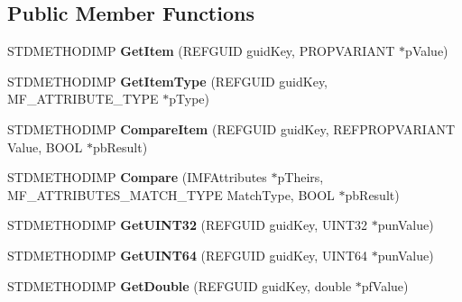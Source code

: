 \subsection*{Public Member Functions}
\begin{DoxyCompactItemize}
\item 
\mbox{\label{class_c_base_attributes_ade07ff0dab41dffe0e0ccc7b4f951cd3}} 
S\+T\+D\+M\+E\+T\+H\+O\+D\+I\+MP {\bfseries Get\+Item} (R\+E\+F\+G\+U\+ID guid\+Key, P\+R\+O\+P\+V\+A\+R\+I\+A\+NT $\ast$p\+Value)
\item 
\mbox{\label{class_c_base_attributes_aab0612685ed338a3b5761e9277651e1b}} 
S\+T\+D\+M\+E\+T\+H\+O\+D\+I\+MP {\bfseries Get\+Item\+Type} (R\+E\+F\+G\+U\+ID guid\+Key, M\+F\+\_\+\+A\+T\+T\+R\+I\+B\+U\+T\+E\+\_\+\+T\+Y\+PE $\ast$p\+Type)
\item 
\mbox{\label{class_c_base_attributes_ae48948090a3b75cc627a6dbda9ec4590}} 
S\+T\+D\+M\+E\+T\+H\+O\+D\+I\+MP {\bfseries Compare\+Item} (R\+E\+F\+G\+U\+ID guid\+Key, R\+E\+F\+P\+R\+O\+P\+V\+A\+R\+I\+A\+NT Value, B\+O\+OL $\ast$pb\+Result)
\item 
\mbox{\label{class_c_base_attributes_a1ebe94e48d97be4675650fd3bd66ace3}} 
S\+T\+D\+M\+E\+T\+H\+O\+D\+I\+MP {\bfseries Compare} (I\+M\+F\+Attributes $\ast$p\+Theirs, M\+F\+\_\+\+A\+T\+T\+R\+I\+B\+U\+T\+E\+S\+\_\+\+M\+A\+T\+C\+H\+\_\+\+T\+Y\+PE Match\+Type, B\+O\+OL $\ast$pb\+Result)
\item 
\mbox{\label{class_c_base_attributes_aa0d9785086d051898963a7dbfdf8f60b}} 
S\+T\+D\+M\+E\+T\+H\+O\+D\+I\+MP {\bfseries Get\+U\+I\+N\+T32} (R\+E\+F\+G\+U\+ID guid\+Key, U\+I\+N\+T32 $\ast$pun\+Value)
\item 
\mbox{\label{class_c_base_attributes_a45740b564d1b0cc27c1cf4fb768161d8}} 
S\+T\+D\+M\+E\+T\+H\+O\+D\+I\+MP {\bfseries Get\+U\+I\+N\+T64} (R\+E\+F\+G\+U\+ID guid\+Key, U\+I\+N\+T64 $\ast$pun\+Value)
\item 
\mbox{\label{class_c_base_attributes_a5f3874148a5346369cbd823db0042976}} 
S\+T\+D\+M\+E\+T\+H\+O\+D\+I\+MP {\bfseries Get\+Double} (R\+E\+F\+G\+U\+ID guid\+Key, double $\ast$pf\+Value)

\end{DoxyCompactItemize}
